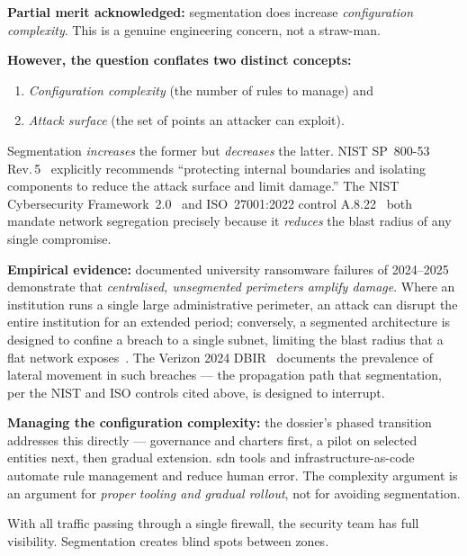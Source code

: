 \begin{answerbox}[Answer to Q1.1]
\textbf{Partial merit acknowledged:} segmentation does increase \emph{configuration complexity}. This is a genuine engineering concern, not a straw-man.

\medskip\noindent\textbf{However, the question conflates two distinct concepts:}
\begin{enumerate}[nosep]
    \item \emph{Configuration complexity} (the number of rules to manage) and
    \item \emph{Attack surface} (the set of points an attacker can exploit).
\end{enumerate}

Segmentation \emph{increases} the former but \emph{decreases} the latter. NIST SP~800-53 Rev.\,5~\cite{nist-sp800-53} explicitly recommends ``protecting internal boundaries and isolating components to reduce the attack surface and limit damage.'' The NIST Cybersecurity Framework~2.0~\cite{nist-csf} and ISO~27001:2022 control A.8.22~\cite{iso27001} both mandate network segregation precisely because it \emph{reduces} the blast radius of any single compromise.

\medskip\noindent\textbf{Empirical evidence:} documented university ransomware failures of 2024--2025 demonstrate that \emph{centralised, unsegmented perimeters amplify damage}. Where an institution runs a single large administrative perimeter, an attack can disrupt the entire institution for an extended period; conversely, a segmented architecture is designed to confine a breach to a single subnet, limiting the blast radius that a flat network exposes~\cite{rennes-cyber}. The Verizon 2024 DBIR~\cite{verizon-dbir2024} documents the prevalence of lateral movement in such breaches --- the propagation path that segmentation, per the NIST and ISO controls cited above, is designed to interrupt.

\medskip\noindent\textbf{Managing the configuration complexity:} the dossier's phased transition addresses this directly --- governance and charters first, a pilot on selected entities next, then gradual extension. \gls{sdn} tools and infrastructure-as-code automate rule management and reduce human error. The complexity argument is an argument for \emph{proper tooling and gradual rollout}, not for avoiding segmentation.
\end{answerbox}

\bigskip

\begin{questionbox}
With all traffic passing through a single firewall, the security team has full visibility. Segmentation creates blind spots between zones.
\end{questionbox}

